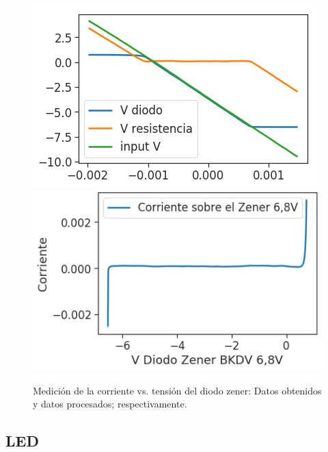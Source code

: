 \begin{figure}[H]
\centering
\includegraphics[scale=0.5]{../EJ1/DiodoZener/datosOsciloscopioZener}
\includegraphics[scale=0.5]{../EJ1/DiodoZener/zenerMedido}
\caption{Medici\'on de la corriente vs. tensi\'on del diodo zener: Datos obtenidos y datos procesados; respectivamente.}
\label{med2b}
\end{figure}


\subsection*{\color{orange}LED}



